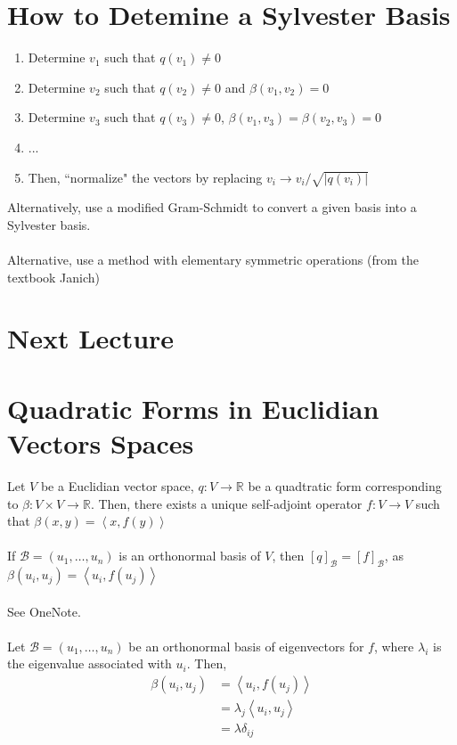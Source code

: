 \documentclass[letterpaper,12pt]{article}
\theoremstyle{definition}
\newcommand{\abs}[1]{\left\lvert #1 \right\rvert}
\newcommand{\inp}[2]{\left< #1, #2 \right>}
\begin{document}
\section*{How to Detemine a Sylvester Basis}
\begin{enumerate}
    \item Determine $v_1$ such that $q(v_1) \neq 0$
    \item Determine $v_2$ such that $q(v_2) \neq 0$ and $\beta(v_1, v_2) = 0$
    \item Determine $v_3$ such that $q(v_3) \neq 0$, $\beta(v_1, v_3) = \beta(v_2, v_3) = 0$
    \item ...
    \item Then, ``normalize" the vectors by replacing $v_i \rightarrow v_i / \sqrt{\abs{q(v_i)}}$
\end{enumerate}
Alternatively, use a modified Gram-Schmidt to convert a given basis into a Sylvester basis.
\\ \\ Alternative, use a method with elementary symmetric operations (from the textbook Janich)


\section*{Next Lecture}
\section*{Quadratic Forms in Euclidian Vectors Spaces}
Let $V$ be a Euclidian vector space, $q: V \rightarrow \mathbb{R}$ be a quadtratic form corresponding to $\beta: V \times V \rightarrow \mathbb{R}$. Then, there exists a unique self-adjoint operator $f: V \rightarrow V$ such that $\beta(x,y) = \inp{x}{f(y)}$
\\ \\ If $\mathcal{B} = (u_1, \dots, u_n)$ is an orthonormal basis of $V$, then $[q]_{\mathcal{B}} = [f]_{\mathcal{B}}$, as $\beta(u_i, u_j) = \inp{u_i}{f(u_j)}$
\\ \\ See OneNote.
\\ \\ Let $\mathcal{B} = (u_1, \dots, u_n)$ be an orthonormal basis of eigenvectors for $f$, where $\lambda_i$ is the eigenvalue associated with $u_i$. Then,
\begin{align*}
    \beta(u_i, u_j) & = \inp{u_i}{f(u_j)} \\
    & = \lambda_j \inp{u_i}{u_j} \\
    & = \lambda \delta_{ij}
\end{align*}
\end{document}
